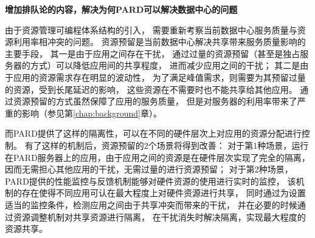\textbf{增加排队论的内容，解决为何PARD可以解决数据中心的问题}

由于资源管理可编程体系结构的引入，
需要重新考察当前数据中心服务质量与资源利用率相冲突的问题。
资源预留是当前数据中心解决共享带来服务质量影响的主要手段，
其一是由于应用之间存在干扰，
通过过量的资源预留（甚至是独占服务器的方式）可以降低应用间的共享程度，
进而减少应用之间的干扰；
其二是由于应用的资源需求存在明显的波动性，
为了满足峰值需求，则需要为其预留过量的资源，受到长尾延迟的影响，
这些资源在不需要时也不能共享给其他应用。
通过资源预留的方式虽然保障了应用的服务质量，
但是对服务器的利用率带来了严重的影响（参见第\ref{chap:background}章）。


而PARD提供了这样的隔离性，可以在不同的硬件层次上对应用的资源分配进行控制。
有了这样的机制后，资源预留的2个场景将得到改善：
对于第1种场景，运行在PARD服务器上的应用，由于应用之间的资源是在硬件层次实现了完全的隔离，
因而无需担心其他应用的干扰，无需过量的进行资源预留；
对于第2种场景，PARD提供的性能监控与反馈机制能够对硬件资源的使用进行实时的监控，
该机制的存在使得不同应用可认在最大程度上对硬件资源进行共享，
同时通过为设置适当的监控条件，检测应用之间由于共享冲突而带来的干扰， 
并在必要的时候通过资源调整机制对共享资源进行隔离，
在干扰消失时解决隔离，实现最大程度的资源共享。

\fi
